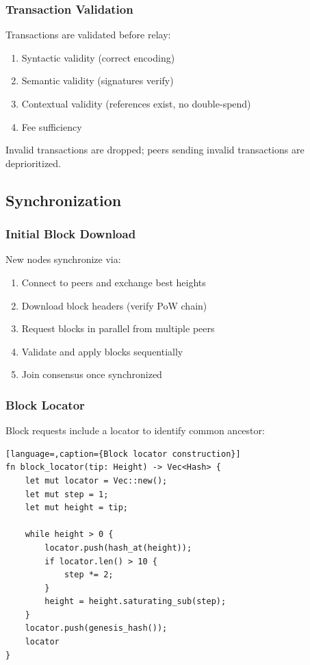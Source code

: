 

\subsubsection{Transaction Validation}

Transactions are validated before relay:
\begin{enumerate}
  \item Syntactic validity (correct encoding)
  \item Semantic validity (signatures verify)
  \item Contextual validity (references exist, no double-spend)
  \item Fee sufficiency
\end{enumerate}

Invalid transactions are dropped; peers sending invalid transactions are
deprioritized.

\subsection{Synchronization}

\subsubsection{Initial Block Download}

New nodes synchronize via:
\begin{enumerate}
  \item Connect to peers and exchange best heights
  \item Download block headers (verify PoW chain)
  \item Request blocks in parallel from multiple peers
  \item Validate and apply blocks sequentially
  \item Join consensus once synchronized
\end{enumerate}

\subsubsection{Block Locator}

Block requests include a locator to identify common ancestor:

\begin{lstlisting}[language=,caption={Block locator construction}]
fn block_locator(tip: Height) -> Vec<Hash> {
    let mut locator = Vec::new();
    let mut step = 1;
    let mut height = tip;

    while height > 0 {
        locator.push(hash_at(height));
        if locator.len() > 10 {
            step *= 2;
        }
        height = height.saturating_sub(step);
    }
    locator.push(genesis_hash());
    locator
}
\end{lstlisting}

